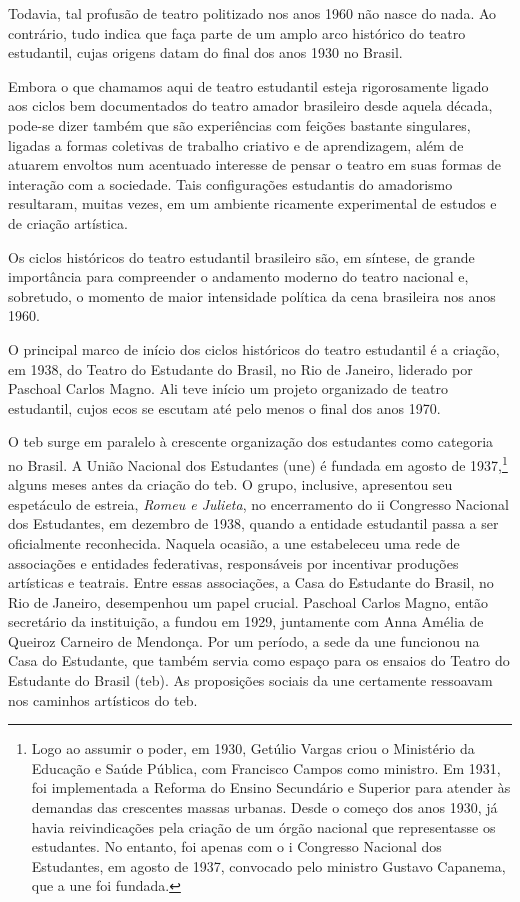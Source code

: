 Todavia, tal profusão de teatro politizado nos anos 1960 não nasce do
nada. Ao contrário, tudo indica que faça parte de um amplo arco
histórico do teatro estudantil, cujas origens datam do final dos anos
1930 no Brasil.

Embora o que chamamos aqui de teatro estudantil esteja rigorosamente
ligado aos ciclos bem documentados do teatro amador brasileiro desde
aquela década, pode-se dizer também que são experiências com feições
bastante singulares, ligadas a formas coletivas de trabalho criativo e
de aprendizagem, além de atuarem envoltos num acentuado interesse de
pensar o teatro em suas formas de interação com a sociedade. Tais
configurações estudantis do amadorismo resultaram, muitas vezes, em um
ambiente ricamente experimental de estudos e de criação artística.

Os ciclos históricos do teatro estudantil brasileiro são, em síntese,
de grande importância para compreender o andamento moderno do teatro
nacional e, sobretudo, o momento de maior intensidade política da cena
brasileira nos anos 1960.

\subject{Pedra angular: Teatro do Estudante do Brasil}

O principal marco de início dos ciclos históricos do teatro estudantil é
a criação, em 1938, do Teatro do Estudante do Brasil, no Rio de Janeiro,
liderado por Paschoal Carlos Magno. Ali teve início um projeto
organizado de teatro estudantil, cujos ecos se escutam até pelo menos o
final dos anos 1970.

O {\sc teb} surge em paralelo à crescente organização dos estudantes como
categoria no Brasil. A União Nacional dos Estudantes ({\sc une}) é fundada em
agosto de 1937,\footnote{Logo ao assumir o poder, em 1930, Getúlio Vargas
  criou o Ministério da Educação e Saúde Pública, com Francisco Campos
  como ministro. Em 1931, foi implementada a Reforma do Ensino
  Secundário e Superior para atender às demandas das crescentes massas
  urbanas. Desde o começo dos anos 1930, já havia reivindicações pela
  criação de um órgão nacional que representasse os estudantes. No
  entanto, foi apenas com o {\sc i} Congresso Nacional dos Estudantes, em
  agosto de 1937, convocado pelo ministro Gustavo Capanema, que a {\sc une}
  foi fundada.} alguns meses antes da criação do {\sc teb}. O grupo,
inclusive, apresentou seu espetáculo de estreia, {\it Romeu e Julieta},
no encerramento do {\sc ii} Congresso Nacional dos Estudantes, em dezembro de
1938, quando a entidade estudantil passa a ser oficialmente reconhecida.
Naquela ocasião, a {\sc une} estabeleceu uma rede de associações e entidades
federativas, responsáveis por incentivar produções artísticas e
teatrais. Entre essas associações, a Casa do Estudante do Brasil, no Rio
de Janeiro, desempenhou um papel crucial. Paschoal Carlos Magno, então
secretário da instituição, a fundou em 1929, juntamente com Anna Amélia
de Queiroz Carneiro de Mendonça. Por um período, a sede da {\sc une} funcionou
na Casa do Estudante, que também servia como espaço para os ensaios do
Teatro do Estudante do Brasil ({\sc teb}). As proposições sociais da {\sc une}
certamente ressoavam nos caminhos artísticos do {\sc teb}.

